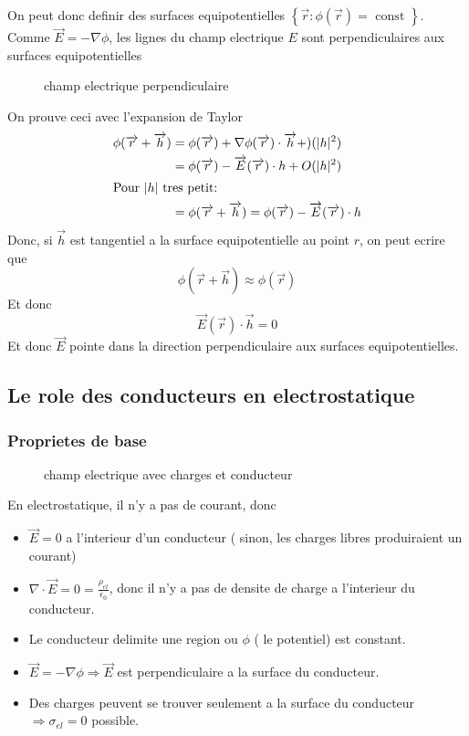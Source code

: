 \documentclass[../main.tex]{subfiles}
\begin{document}
On peut donc definir des surfaces equipotentielles $ \left\{ \vec{r} : \phi( \vec{r}) = \text{ const }  \right\} $.\\
Comme $\vec{E} = - \nabla \phi$, les lignes du champ electrique $E$ sont perpendiculaires aux surfaces equipotentielles
\begin{figure}[H]
    \centering
    \caption{champ electrique perpendiculaire}
    \label{fig:champ-electrique-perpendiculaire}
\end{figure}
On prouve ceci avec l'expansion de Taylor
\begin{align*}
	\phi( \vec{r} + \vec{h})  &= \phi( \vec{r}) + \nabla \phi( \vec{r}) \cdot \vec{h} + )( |h|^{2}) \\
				  &= \phi( \vec{r}) - \vec{E}( \vec{r}) \cdot h + O( |h|^{2}) \\
\intertext{Pour $|h|$ tres petit:}
				  &=\phi( \vec{r}+\vec{h}) = \phi( \vec{r})  - \vec{E}( \vec{r}) \cdot h
\end{align*}
Donc, si $\vec{h}$ est tangentiel a la surface equipotentielle au point $r$, on peut ecrire que
\[ 
	\phi( \vec{r}+ \vec{h})\approx \phi( \vec{r}) 
\]
Et donc 
\[ 
	\vec{E}( \vec{r}) \cdot \vec{h}=0
\]
Et donc $\vec{E}$ pointe dans la direction perpendiculaire aux surfaces equipotentielles.
\subsection{Le role des conducteurs en electrostatique}
\subsubsection{Proprietes de base}
\begin{figure}[H]
    \centering
    \caption{champ electrique avec charges et conducteur}
    \label{fig:champ-electrique-avec-charges}
\end{figure}
En electrostatique, il n'y a pas de courant, donc
\begin{itemize}
	\item $\vec{E}=0$ a l'interieur d'un conducteur ( sinon, les charges libres produiraient un courant) 
	\item $\nabla \cdot \vec{E}=0 = \frac{\rho_{el} }{\epsilon_0}$, donc il n'y a pas de densite de charge a l'interieur du conducteur.
	\item Le conducteur delimite une region ou $\phi$ ( le potentiel) est constant.
	\item $\vec{E}= - \nabla \phi \Rightarrow \vec{E}$ est perpendiculaire a la surface du conducteur.
	\item Des charges peuvent se trouver seulement a la surface du conducteur $ \Rightarrow  \sigma_{el} =0$ possible.
\end{itemize}
\end{document}
